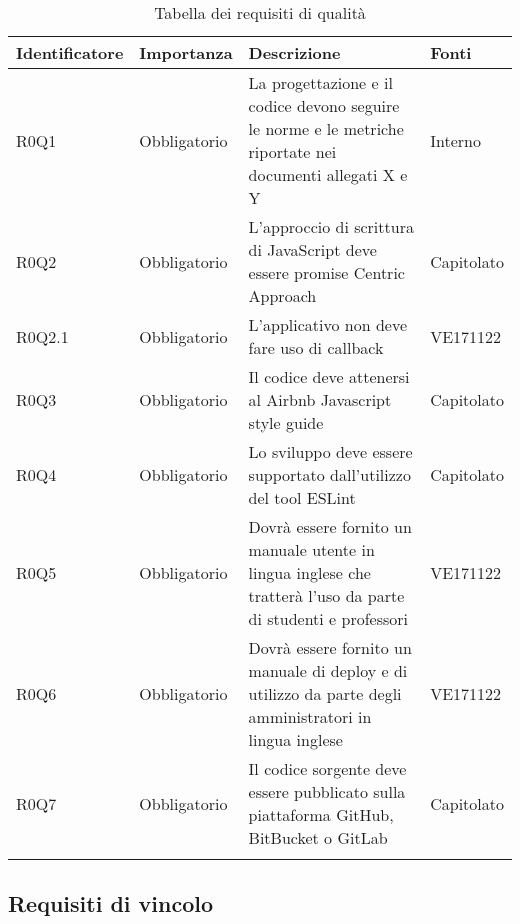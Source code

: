\documentclass[AnalisiDeiRequisiti.tex]{subfiles}
\begin{document}
\label{table:Tabella requisiti di qualita'} %
\begin{longtable}[H]{|p{2.5cm}|p{2.5cm}|p{5cm}|p{2cm}|}
	\hline
	\rowcolor[HTML]{38FFF8} 
	\textbf{Identificatore} & \textbf{Importanza} & \textbf{Descrizione} & \textbf{Fonti} \\ \hline
	\endhead
	R0Q1 & Obbligatorio & La progettazione e il codice devono seguire le norme e le metriche riportate nei documenti allegati X e Y & Interno \\ \hline %
	R0Q2 & Obbligatorio & L'approccio di scrittura di JavaScript deve essere promise Centric Approach & Capitolato \\ \hline
	R0Q2.1 & Obbligatorio & L'applicativo non deve fare uso di callback & VE171122 \\ \hline
	R0Q3 & Obbligatorio & Il codice deve attenersi al Airbnb Javascript style guide & Capitolato \\ \hline
	R0Q4 & Obbligatorio & Lo sviluppo deve essere supportato dall'utilizzo del tool ESLint & Capitolato \\ \hline
	R0Q5 & Obbligatorio & Dovrà essere fornito un manuale utente in lingua inglese che tratterà l'uso da parte di studenti e professori & VE171122 \\ \hline
	R0Q6 & Obbligatorio & Dovrà essere fornito un manuale di deploy e di utilizzo da parte degli amministratori in lingua inglese & VE171122 \\ \hline
	R0Q7 & Obbligatorio & Il codice sorgente deve essere pubblicato sulla piattaforma GitHub, BitBucket o GitLab & Capitolato \\ \hline
	\caption{Tabella dei requisiti di qualità}
\end{longtable}

\subsection{Requisiti di vincolo}

\label{table:Tabella requisiti di vincolo}
\end{document}
